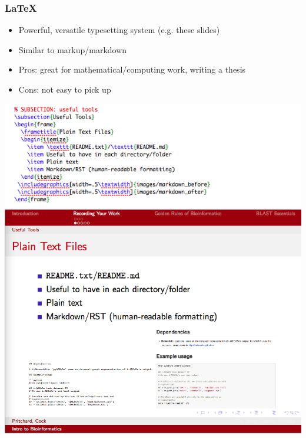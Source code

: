  \begin{frame}
   \frametitle{\LaTeX}
   \begin{itemize}
     \item Powerful, versatile typesetting system (e.g. these slides)
     \item Similar to markup/markdown
     \item Pros: great for mathematical/computing work, writing a thesis
     \item Cons: not easy to pick up
  \end{itemize}
  \begin{center}
     \includegraphics[width=.35\textwidth]{images/latex_before}
     \includegraphics[width=.35\textwidth]{images/latex_after}     
  \end{center}
\end{frame}
